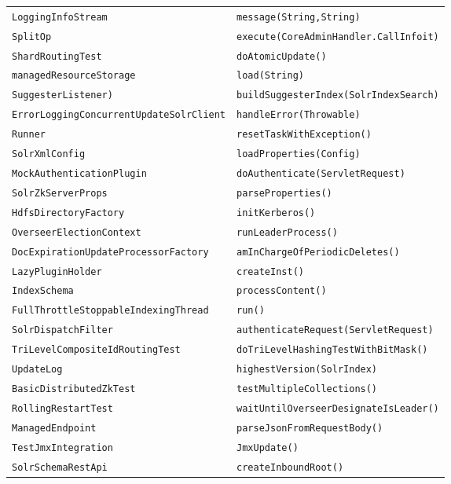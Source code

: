 \begin{center}
\begin{longtable}{ll}
\lstinline/LoggingInfoStream/&{\lstinline/message(String,String)/}\\
\lstinline/SplitOp/&{\lstinline/execute(CoreAdminHandler.CallInfoit)/}\\
\lstinline/ShardRoutingTest/&{\lstinline/doAtomicUpdate()/}\\
\lstinline/managedResourceStorage/&{\lstinline/load(String)/}\\
\lstinline/SuggesterListener)/&{\lstinline/buildSuggesterIndex(SolrIndexSearch)/}\\
\lstinline/ErrorLoggingConcurrentUpdateSolrClient/&{\lstinline/handleError(Throwable)/}\\
\lstinline/Runner/&{\lstinline/resetTaskWithException()/}\\
\lstinline/SolrXmlConfig/&{\lstinline/loadProperties(Config)/}\\
\lstinline/MockAuthenticationPlugin/&{\lstinline/doAuthenticate(ServletRequest)/}\\
\lstinline/SolrZkServerProps/&{\lstinline/parseProperties()/}\\
\lstinline/HdfsDirectoryFactory/&{\lstinline/initKerberos()/}\\
\lstinline/OverseerElectionContext/&{\lstinline/runLeaderProcess()/}\\
\lstinline/DocExpirationUpdateProcessorFactory/&{\lstinline/amInChargeOfPeriodicDeletes()/}\\
\lstinline/LazyPluginHolder/&{\lstinline/createInst()/}\\
\lstinline/IndexSchema/&{\lstinline/processContent()/}\\
\lstinline/FullThrottleStoppableIndexingThread/&{\lstinline/run()/}\\
\lstinline/SolrDispatchFilter/&{\lstinline/authenticateRequest(ServletRequest)/}\\
\lstinline/TriLevelCompositeIdRoutingTest/&{\lstinline/doTriLevelHashingTestWithBitMask()/}\\
\lstinline/UpdateLog/&{\lstinline/highestVersion(SolrIndex)/}\\
\lstinline/BasicDistributedZkTest/&{\lstinline/testMultipleCollections()/}\\
\lstinline/RollingRestartTest/&{\lstinline/waitUntilOverseerDesignateIsLeader()/}\\
\lstinline/ManagedEndpoint/&{\lstinline/parseJsonFromRequestBody()/}\\
\lstinline/TestJmxIntegration/&{\lstinline/JmxUpdate()/}\\
\lstinline/SolrSchemaRestApi/&{\lstinline/createInboundRoot()/}\\

\end{longtable}
\end{center}
